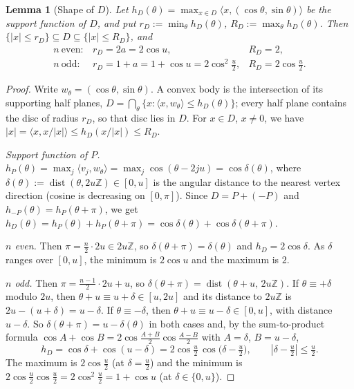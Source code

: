 \documentclass[11pt,a4paper]{article}
\newtheorem{lemma}[theorem]{Lemma}
\theoremstyle{definition}
\theoremstyle{remark}
\DeclareMathOperator{\dist}{dist}
\newcommand{\Z}{\mathbb{Z}}
\newcommand{\ip}[2]{\langle #1,#2\rangle}
\begin{document}
\begin{lemma}[Shape of $D$]\label{lem:D}
Let $h_D(\theta)=\max_{x\in D}\ip{x}{(\cos\theta,\sin\theta)}$ be the support function of $D$, and put $r_D:=\min_\theta h_D(\theta)$, $R_D:=\max_\theta h_D(\theta)$. Then
$\{|x|\le r_D\}\subseteq D\subseteq\{|x|\le R_D\}$, and
\[
\begin{array}{lll}
n\ \text{even}: & r_D=2a=2\cos u, & R_D=2,\\[3pt]
n\ \text{odd}: & r_D=1+a=1+\cos u=2\cos^2\tfrac u2, & R_D=2\cos\tfrac u2 .
\end{array}
\]
\end{lemma}
\begin{proof}
Write $w_\theta=(\cos\theta,\sin\theta)$. A convex body is the intersection of its supporting half planes, $D=\bigcap_\theta\{x:\ip{x}{w_\theta}\le h_D(\theta)\}$; every half plane contains the disc of radius $r_D$, so that disc lies in $D$.
For $x\in D$, $x\ne0$, we have $|x|=\ip{x}{x/|x|}\le h_D(x/|x|)\le R_D$.

\emph{Support function of $P$.} $h_P(\theta)=\max_j\ip{v_j}{w_\theta}=\max_j\cos(\theta-2ju)=\cos\delta(\theta)$, where $\delta(\theta):=\dist(\theta,2u\Z)\in[0,u]$ is the angular distance to the nearest vertex direction (cosine is decreasing on $[0,\pi]$).
Since $D=P+(-P)$ and $h_{-P}(\theta)=h_P(\theta+\pi)$, we get $h_D(\theta)=h_P(\theta)+h_P(\theta+\pi)=\cos\delta(\theta)+\cos\delta(\theta+\pi)$.

\emph{$n$ even.} Then $\pi=\tfrac n2\cdot2u\in2u\Z$, so $\delta(\theta+\pi)=\delta(\theta)$ and $h_D=2\cos\delta$. As $\delta$ ranges over $[0,u]$, the minimum is $2\cos u$ and the maximum is $2$.

\emph{$n$ odd.} Then $\pi=\tfrac{n-1}2\cdot2u+u$, so $\delta(\theta+\pi)=\dist(\theta+u,\,2u\Z)$. If $\theta\equiv+\delta$ modulo $2u$, then $\theta+u\equiv u+\delta\in[u,2u]$ and its distance to $2u\Z$ is $2u-(u+\delta)=u-\delta$.
If $\theta\equiv-\delta$, then $\theta+u\equiv u-\delta\in[0,u]$, with distance $u-\delta$. So $\delta(\theta+\pi)=u-\delta(\theta)$ in both cases and, by the sum-to-product formula $\cos A+\cos B=2\cos\frac{A+B}2\cos\frac{A-B}2$ with $A=\delta$, $B=u-\delta$,
\[
h_D=\cos\delta+\cos(u-\delta)=2\cos\tfrac u2\,\cos\big(\delta-\tfrac u2\big),\qquad |\delta-\tfrac u2|\le\tfrac u2 .
\]
The maximum is $2\cos\frac u2$ (at $\delta=\frac u2$) and the minimum is $2\cos\frac u2\cos\frac u2=2\cos^2\frac u2=1+\cos u$ (at $\delta\in\{0,u\}$).
\end{proof}

\end{document}
